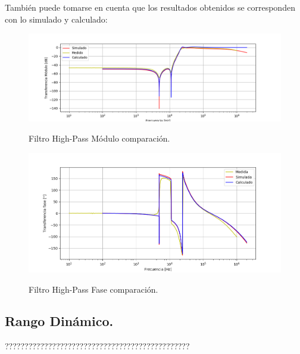 También puede tomarse en cuenta que los resultados obtenidos se corresponden con lo simulado y calculado:

\begin{figure}[H]
	\centering
	\includegraphics[width=\textwidth]{Imagenes-Ej3/BodeMedCalcSim.png}
	\label{fig:BodeSedraComp}
	\caption{Filtro High-Pass Módulo comparación.}
\end{figure}
\begin{figure}[H]
	\centering
	\includegraphics[width=\textwidth]{Imagenes-Ej3/BodeMedCalcSimFase.png}
	\label{fig:FaseBodeSedraComp}
	\caption{Filtro High-Pass Fase comparación.}
\end{figure}
\subsection{Rango Dinámico.}
\begin{Huge}
???????????????????????????????????????????????
\end{Huge}
